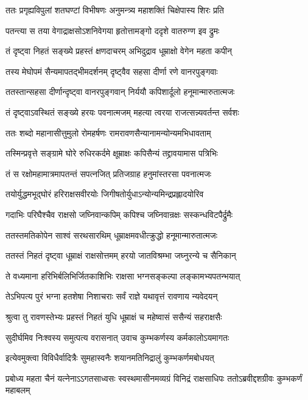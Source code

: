 \twolineshloka
{ततः प्रगृह्यविपुलां शतघण्टां विभीषणः}
{अनुमन्त्र्य महाशक्तिं चिक्षेपास्य शिरः प्रति}


\twolineshloka
{पतन्त्या स तया वेगाद्राक्षसोऽशनिवेगया}
{हृतोत्तामङ्गो ददृशे वातरुग्ण इव द्रुमः}


\twolineshloka
{तं दृष्ट्वा निहतं सङ्ख्ये प्रहस्तं क्षणदाचरम्}
{अभिदुद्राव धूम्राक्षो वेगेन महता कपीन्}


\twolineshloka
{तस्य मेघोपमं सैन्यमापतद्भीमदर्शनम्}
{दृष्ट्वैव सहसा दीर्णा रणे वानरपुङ्गवाः}


\twolineshloka
{ततस्तान्सहसा दीर्णान्दृष्ट्वा वानरपुङ्गवान्}
{निर्ययौ कपिशार्दूलो हनूमान्मारुतात्मजः}


\twolineshloka
{तं दृष्ट्वाऽवस्थितं सङ्ख्ये हरयः पवनात्मजम्}
{महत्या त्वरया राजत्सन्न्यवर्तन्त सर्वशः}


\twolineshloka
{ततः शब्दो महानासीत्तुमुलो रोमहर्षणः}
{रामरावणसैन्यानामन्योन्यमभिधावताम्}


\twolineshloka
{तस्मिन्प्रवृत्ते सङ्ग्रामे घोरे रुधिरकर्दमे}
{क्षूम्राक्षः कपिसैन्यं तद्द्रावयामास पत्रिभिः}


\twolineshloka
{तं स रक्षोमहामात्रमापतन्तं सपत्नजित्}
{प्रतिजग्राह हनुमांस्तरसा पवनात्मजः}


\twolineshloka
{तयोर्युद्धमभूद्घोरं हरिराक्षसवीरयोः}
{जिगीषतोर्युधाऽन्योन्यमिन्द्रप्रह्लादयोरिव}


\twolineshloka
{गदाभिः परिघैश्चैव राक्षसो जघ्निवान्कपिम्}
{कपिश्च जघ्निवान्रक्षः सस्कन्धविटपैर्द्रुमैः}


\twolineshloka
{ततस्तमतिकोपेन साश्वं सरथसारथिम्}
{धूम्राक्षमवधीत्क्रुद्धो हनूमान्मारुतात्मजः}


\twolineshloka
{ततस्तं निहतं दृष्ट्वा धूम्राक्षं राक्षसोत्तमम्}
{हरयो जातविश्रम्भा जघ्नुरन्ये च सैनिकान्}


\twolineshloka
{ते वध्यमाना हरिभिर्बलिभिर्जितकाशिभिः}
{राक्षसा भग्नसङ्कल्पा लङ्कामभ्यपतन्भयात्}


\twolineshloka
{तेऽभिपत्य पुरं भग्ना हतशेषा निशाचराः}
{सर्वं राज्ञे यथावृत्तं रावणाय न्यवेदयन्}


\twolineshloka
{श्रुत्वा तु रावणस्तेभ्यः प्रहस्तं निहतं युधि}
{धूम्राक्षं च महेष्वासं ससैन्यं सहराक्षसैः}


\twolineshloka
{सुदीर्घमिव निःश्वस्य समुत्पत्य वरासनात्}
{उवाच कुम्भकर्णस्य कर्मकालोऽयमागतः}


\twolineshloka
{इत्येवमुक्त्वा विविधैर्वादित्रैः सुमहास्वनैः}
{शयानमतिनिद्रालुं कुम्भकर्णमबोधयत्}


\threelineshloka
{प्रबोध्य महता चैनं यत्नेनाऽऽगतसाध्वसः}
{स्वस्थमासीनमव्यग्रं विनिद्रं राक्षसाधिपः}
{ततोऽब्रवीद्दशग्रीवः कुम्भकर्णं महाबलम्}


